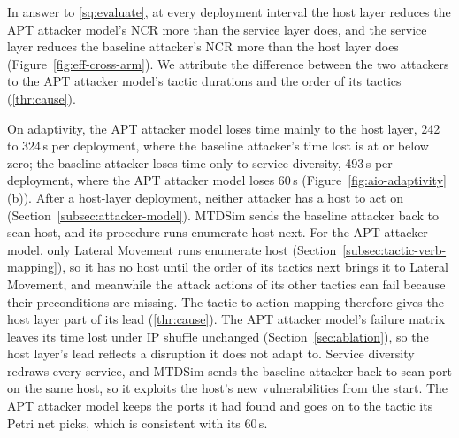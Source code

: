 \documentclass{cshonours}
\begin{document}
In answer to \ref{sq:evaluate}, at every deployment interval the host layer
reduces the APT attacker model's NCR more than the service layer does, and
the service layer reduces the baseline attacker's NCR more than the host layer
does (Figure~\ref{fig:eff-cross-arm}). We attribute the difference between
the two attackers to the APT attacker model's tactic durations and the order of
its tactics (\ref{thr:cause}).

On adaptivity, the APT attacker model loses time mainly to the host layer, 242
to 324\,s per deployment, where the baseline attacker's time lost is at or
below zero; the baseline attacker loses time only to service diversity,
493\,s per deployment, where the APT attacker model loses 60\,s
(Figure~\ref{fig:aio-adaptivity}(b)). After a host-layer deployment, neither
attacker has a host to act on (Section~\ref{subsec:attacker-model}). MTDSim
sends the baseline attacker back to scan host, and its procedure runs
enumerate host next. For the APT attacker model, only Lateral Movement runs
enumerate host (Section~\ref{subsec:tactic-verb-mapping}), so it has no host
until the order of its tactics next brings it to Lateral Movement, and
meanwhile the attack actions of its other tactics can fail because
their preconditions are missing. The tactic-to-action mapping therefore gives
the host layer part of its lead (\ref{thr:cause}). The APT attacker model's
failure matrix leaves its time lost under IP shuffle unchanged
(Section~\ref{sec:ablation}), so the host layer's lead reflects a disruption
it does not adapt to.
Service
diversity redraws every service, and MTDSim sends the baseline attacker back
to scan port on the same host, so it exploits the host's new vulnerabilities
from the start. The APT attacker model keeps the ports it had found and goes
on to the tactic its Petri net picks, which is consistent with its 60\,s.
\end{document}
